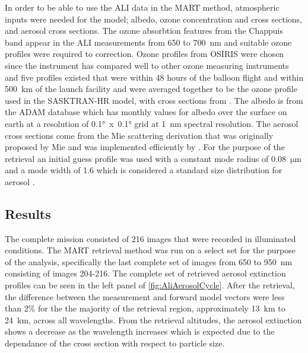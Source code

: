 \documentclass[12pt]{article}
\begin{document}
In order to be able to use the ALI data in the MART method, atmospheric inputs were needed for the model; albedo, ozone concentration and cross sections, and aerosol cross sections. The ozone absorbtion features from the Chappuis band appear in the ALI measurements from 650 to 700~nm and suitable ozone profiles were required to correction. Ozone profiles from OSIRIS were chosen since the instrument has compared well to other ozone measuring instruments \citep{Bourassa2014} and five profiles existed that were within 48 hours of the balloon flight and within 500~km of the launch facility and were averaged together to be the ozone profile used in the SASKTRAN-HR model, with cross sections from \cite{Burrows1999}. The albedo is from the ADAM database \citep{Muller2013} which has monthly values for albedo over the surface on earth at a resolution of 0.1\si{\degree}~x~0.1\si{\degree} grid at 1~nm spectral resolution. The aerosol cross sections come from the Mie scattering derivation that was originally proposed by Mie and was implemented efficiently by \cite{Wiscombe1980}. For the purpose of the retrieval an initial guess profile was used with a constant mode radius of 0.08~$\si{\micro\metre}$  and a mode width of 1.6 which is considered a standard size distribution for aerosol \citep{Deshler2003}.

\subsection{Results}

The complete mission consisted of 216 images that were recorded in illuminated conditions. The MART retrieval method was run on a select set for the purpose of the analysis, specifically the last complete set of images from 650 to 950~nm consisting of images 204-216. The complete set of retrieved aerosol extinction profiles can be seen in the left panel of \autoref{fig:AliAerosolCycle}. After the retrieval, the difference between the measurement and forward model vectors were less than 2\% for the the majority of the retrieval region, approximately 13~km to 24~km, across all wavelengths. From the retrieval altitudes, the aerosol extinction shows a decrease as the wavelength increases which is expected due to the dependance of the cross section with respect to particle size.
\end{document}
